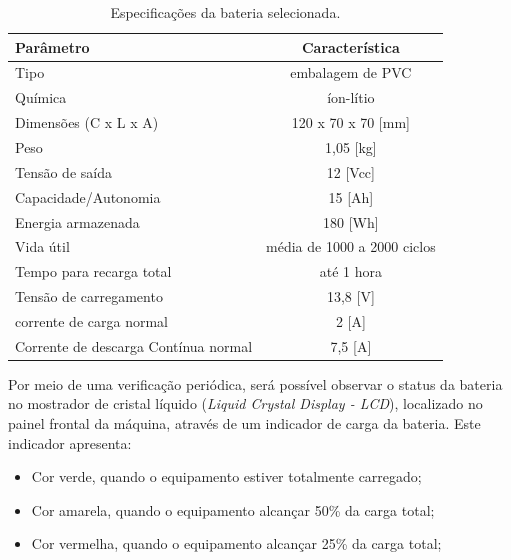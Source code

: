 \begin{table}[H]
    \centering
    \footnotesize
    \caption{Especificações da bateria selecionada.}
    \label{Energia_bateria}
    \begin{adjustbox}{max width = \textwidth}
        \begin{tabular}{|l|c|}
            \hline
            \rowcolor[HTML]{A8DADC}
            Parâmetro & Característica
            \\ \hline
            Tipo & embalagem de PVC
            \\ \hline
            Química & íon-lítio
            \\ \hline
Dimensões  (C x L x A) & 120 x 70 x 70 [mm]
\\ \hline
 Peso & 1,05 [kg]
 \\ \hline
 Tensão de saída & 12 [Vcc]
 \\ \hline
 Capacidade/Autonomia & 15 [Ah]
 \\ \hline
 Energia armazenada & 180 [Wh]
 \\ \hline
 Vida útil & média de 1000 a 2000 ciclos
 \\ \hline
 Tempo para recarga total & até 1 hora
 \\ \hline
             Tensão de carregamento &  13,8 [V]
             \\ \hline
             corrente de carga normal & 2 [A] 
             \\ \hline
             Corrente de descarga Contínua normal & 7,5 [A]
            \\ \hline
        \end{tabular}
    \end{adjustbox}
\end{table} 

Por meio de uma verificação periódica, será possível observar o status da bateria no mostrador de cristal líquido (\textit{Liquid Crystal Display - LCD}), localizado no painel frontal da máquina, através de um indicador de carga da bateria. Este indicador apresenta:
 
 \begin{itemize}
     \item Cor verde, quando o equipamento estiver totalmente carregado;
     
     \item Cor amarela, quando o equipamento alcançar 50\% da carga total;
     
     \item Cor vermelha, quando o equipamento alcançar 25\% da carga total;
 \end{itemize}

